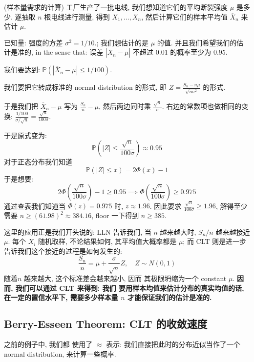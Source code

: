 \begin{example}{(样本量需求的计算)}
工厂生产了一批电线, 
我们想知道它们的平均断裂强度 $\mu$ 是多少. 
遂抽取 $n$ 根电线进行测量, 
得到 $X_{1}, ..., X_{n}$, 
然后计算它们的样本平均值 $\overline{X}_{n}$ 
来估计 $\mu$. 

已知量: 强度的方差 $\sigma^{2} = 1/10$.; 
我们想估计的是 $\mu$ 的值. 
并且我们希望我们的估计是准的, 
in the sense that: 误差 $|\overline{X}_{n} - \mu|$ 不超过 0.01 的概率至少为 0.95. 

\begin{solution}
我们要达到: $\mathbb{P}(|\overline{X}_{n} - \mu| \le 1/100)$.

我们要把它转成标准的 normal distribution 的形式,
即 $Z = \frac{S_{n} - n\mu}{\sqrt{n\sigma^{2}}}$ 的形式.

于是我们把 $\overline{X}_{n} - \mu$ 写为 $\frac{S_{n}}{n} - \mu$,
然后两边同时乘 $\frac{\sqrt{n}}{\sigma}$.
右边的常数项也做相同的变换: $\frac{1/100}{\sigma / \sqrt{n}} = \frac{\sqrt{n}}{100\sigma}$.

于是原式变为:
$$
\mathbb{P}(|Z| \le \frac{\sqrt{n}}{100\sigma}) \approx 0.95
$$
对于正态分布我们知道
$$\mathbb{P}(|Z| \le x) = 2\Phi(x) - 1$$
于是想要: 
$$2\Phi\left(\frac{\sqrt{n}}{100\sigma}\right) - 1 \ge 0.95 \implies \Phi\left(\frac{\sqrt{n}}{100\sigma}\right) \ge 0.975$$
通过查表我们知道当 $\Phi(z) = 0.975$ 时,
 $z \approx 1.96$. 因此要求
 $\frac{\sqrt{n}}{100\sigma} \ge 1.96$, 
 解得至少需要 $n \ge (61.98)^{2} \approx 384.16$, 
 floor 一下得到 $n \ge 385$.
\end{solution}
\begin{remark}
这里的应用正是我们开头说的:
LLN 告诉我们, 当 $n$ 越来越大时,
 $S_n/n$ 越来越接近 $\mu$. 
每个 $X_i$ 随机取样, 不论结果如何, 
其平均值大概率都是 $\mu$; 而
CLT 则是进一步告诉我们这个接近的过程是如何发生的:
$$
 \frac{S_n}{n} = \mu + \frac{\sigma}{\sqrt{n}}Z, \quad Z \sim N(0,1)
$$ 
 随着$n$ 越来越大, 这个标准差会越来越小, 因而
其极限坍缩为一个 constant $\mu$.
\textbf{因而, 我们可以通过 CLT 来得到: 我们
要用样本均值来估计分布的真实均值的话, 
在一定的置信水平下, 需要多少样本量 $n$ 才能保证我们的估计是准的. }

\end{remark}
\end{example}



\subsection{Berry-Esseen Theorem: CLT 的收敛速度}
之前的例子中, 我们都
使用了 $\approx$ 表示:
我们直接把此时的分布近似当作了一个
 normal distribution, 来计算一些概率.


